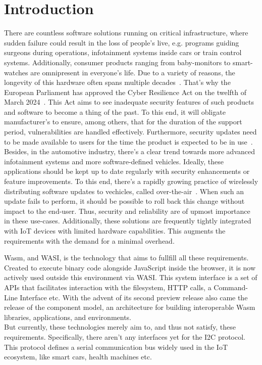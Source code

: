 \chapter{Introduction}
\label{chap:intro}


There are countless software solutions running on critical infrastructure, where sudden failure could result in the loss of people's live, e.g. programs guiding surgeons during operations, infotainment systems inside cars or train control systems. Additionally, consumer products ranging from baby-monitors to smart-watches are omnipresent in everyone's life. Due to a variety of reasons, the longevity of this hardware often spans multiple decades~\cite{ars:trains}.  That's why the European Parliament has approved the Cyber Resilience Act on the twelfth of March 2024~\cite{eu:cra:update}. This Act aims to see inadequate security features of such products and software to become a thing of the past. To this end, it will obligate manufacturer's to ensure, among others, that for the duration of the support period, vulnerabilities are handled effectively. Furthermore, security updates need to be made available to users for the time the product is expected to be in use~\cite{eu:cra}. Besides, in the automotive industry, there's a clear trend towards more advanced infotainment systems and more software-defined vehicles. Ideally, these applications should be kept up to date regularly with security enhancements or feature improvements. To this end, there's a rapidly growing practice of wirelessly distributing software updates to vechicles, called over-the-air~\cite{aptiv:ota}.
When such an update fails to perform, it should be possible to roll back this change without impact to the end-user. Thus, security and reliability are of upmost importance in these use-cases. Additionally, these solutions are frequently tightly integrated with \gls{IoT} devices with limited hardware capabilities. This augments the requirements with the demand for a minimal overhead.


\gls{Wasm}, and \gls{WASI}, is the technology that aims to fullfill all these requirements. Created to execute binary code alongside JavaScript inside the browser, it is now actively used outside this environment via \gls{WASI}. This system interface is a set of APIs that facilitates interaction with the filesystem, HTTP calls, a Command-Line Interface etc. With the advent of its second preview release also came the release of the component model, an architecture for building interoperable \gls{Wasm} libraries, applications, and environments. \\
But currently, these technologies merely aim to, and thus not satisfy, these requirements. Specifically, there aren't any interfaces yet for the \gls{I2C} protocol. This protocol defines a serial communication bus widely used in the \gls{IoT} ecosystem, like smart cars, health machines etc.

